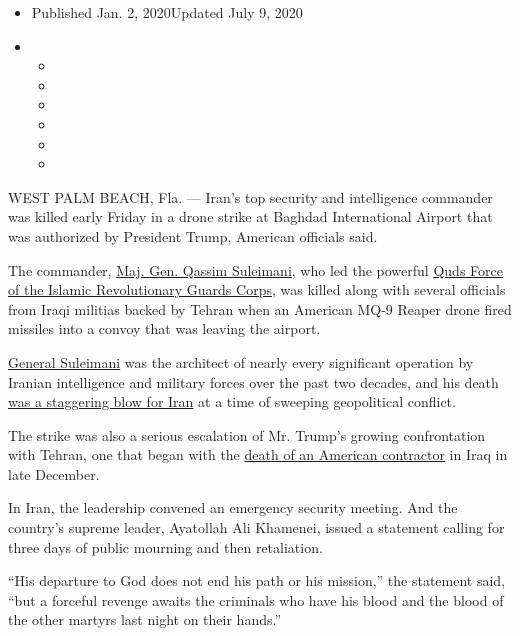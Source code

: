 \begin{itemize}
\item
  Published Jan. 2, 2020Updated July 9, 2020
\item
  \begin{itemize}
  \item
  \item
  \item
  \item
  \item
  \item
  \end{itemize}
\end{itemize}

WEST PALM BEACH, Fla. --- Iran's top security and intelligence commander
was killed early Friday in a drone strike at Baghdad International
Airport that was authorized by President Trump, American officials said.

The commander,
\href{https://www.nytimes3xbfgragh.onion/2020/01/03/world/middleeast/suleimani-dead.html}{Maj.
Gen. Qassim Suleimani}, who led the powerful
\href{https://www.nytimes3xbfgragh.onion/2020/01/03/world/middleeast/suleimani-dead.html}{Quds
Force of the Islamic Revolutionary Guards Corps}, was killed along with
several officials from Iraqi militias backed by Tehran when an American
MQ-9 Reaper drone fired missiles into a convoy that was leaving the
airport.

\href{https://www.nytimes3xbfgragh.onion/2020/07/09/world/middleeast/qassim-suleimani-killing-unlawful.html}{General
Suleimani} was the architect of nearly every significant operation by
Iranian intelligence and military forces over the past two decades, and
his death
\href{https://www.nytimes3xbfgragh.onion/2020/01/02/world/middleeast/qassem-soleimani-iraq-iran-attack.html}{was
a staggering blow for Iran} at a time of sweeping geopolitical conflict.

The strike was also a serious escalation of Mr. Trump's growing
confrontation with Tehran, one that began with the
\href{https://www.nytimes3xbfgragh.onion/2019/12/27/us/politics/american-rocket-attack-iraq.html}{death
of an American contractor} in Iraq in late December.

In Iran, the leadership convened an emergency security meeting. And the
country's supreme leader, Ayatollah Ali Khamenei, issued a statement
calling for three days of public mourning and then retaliation.

``His departure to God does not end his path or his mission,'' the
statement said, ``but a forceful revenge awaits the criminals who have
his blood and the blood of the other martyrs last night on their
hands.''

